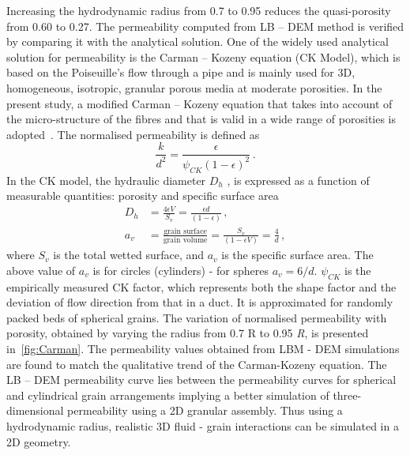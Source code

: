 Increasing the hydrodynamic radius from 0.7 to 0.95 reduces the quasi-porosity 
from 0.60 to 0.27. The permeability computed from LB – DEM method is verified 
by comparing it with the analytical solution. One of the widely used analytical 
solution for permeability is the Carman – Kozeny equation (CK Model), 
which is based on the Poiseuille's flow through a pipe and is mainly used for 
3D, homogeneous, isotropic, granular porous media at moderate porosities. In 
the present study, a modified Carman – Kozeny equation that takes into account 
of the micro-structure of the fibres and that is valid in a wide range of 
porosities is adopted~\citep{Yazdchi2011}. The normalised permeability is 
defined as
%
%
\begin{equation}
\frac{k}{d^2} = \frac{\epsilon}{\psi_{CK}(1-\epsilon)^2} \,.
\end{equation}
%
In the CK model, the hydraulic diameter $D_h$ , is expressed as a function of 
measurable quantities: porosity and specific surface area
%
\begin{align}
D_h & = \frac{4\epsilon V}{S_v}=\frac{\epsilon d}{(1 - \epsilon)} \,, \\
a_v & = \frac{\mbox{grain surface}}{\mbox{grain volume}} = 
\frac{S_v}{(1-\epsilon V)} = \frac{4}{d} \,,
\end{align}
%
where $S_v$ is the total wetted surface, and $a_v$ is the specific surface 
area. The above value of $a_v$ is for circles (cylinders) - for spheres $a_v = 
6/d$. $\psi_{CK}$ is the empirically  measured CK factor, which represents both 
the shape factor and the deviation of flow direction from that in a duct. It is 
approximated for randomly packed beds of spherical grains. The variation of 
normalised permeability with porosity, obtained by varying the radius from 0.7 R
to 0.95 \textit{R}, is presented in~\cref{fig:Carman}. The permeability values 
obtained 
from LBM - DEM simulations are found to match the qualitative trend of the 
Carman-Kozeny equation. The LB – DEM permeability curve lies between the 
permeability curves for spherical and cylindrical grain arrangements implying a 
better simulation of three-dimensional permeability using a 2D granular 
assembly. Thus using a hydrodynamic radius, realistic 3D fluid - grain 
interactions can be simulated in a 2D geometry.

